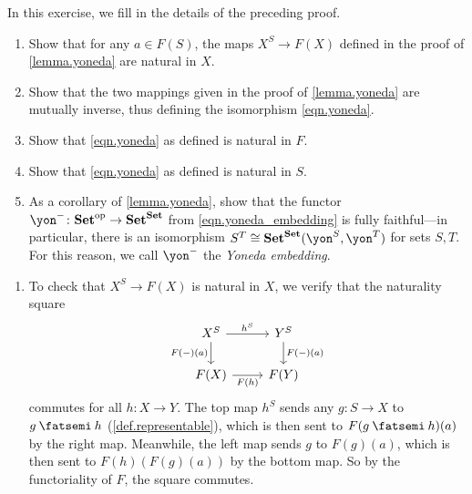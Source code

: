 \documentclass[Book-Poly]{subfiles}
\begin{document}
\begin{exercise}\label{exc.finish_proof_yoneda}
    In this exercise, we fill in the details of the preceding proof.
    \begin{enumerate}
        \item Show that for any $a\in F(S)$, the maps $X^S\to F(X)$ defined in the proof of \cref{lemma.yoneda} are natural in $X$.
        \item Show that the two mappings given in the proof of \cref{lemma.yoneda} are mutually inverse, thus defining the isomorphism \eqref{eqn.yoneda}.
        \item Show that \eqref{eqn.yoneda} as defined is natural in $F$.
        \item Show that \eqref{eqn.yoneda} as defined is natural in $S$.
        \item \label{exc.finish_proof_yoneda.embed} As a corollary of \cref{lemma.yoneda}, show that the functor $\yon^-\colon\smset\op\to\smset^\smset$ from \eqref{eqn.yoneda_embedding} is fully faithful---in particular, there is an isomorphism $S^T\iso \smset^\smset(\yon^S,\yon^T)$ for sets $S,T$.
        For this reason, we call $\yon^-$ the \emph{Yoneda embedding}.
        \qedhere
    \end{enumerate}

    \begin{solution}
        \begin{enumerate}
            \item To check that $X^S \to F(X)$ is natural in $X$, we verify that the naturality square
            \[
            \begin{tikzcd}[ampersand replacement=\&]
                X^S\ar[r, "h^S"]\ar[d, "F(-)(a)"']\&
                Y^S\ar[d, "F(-)(a)"]\\
                F(X)\ar[r, "F(h)"']\&
                F(Y)
            \end{tikzcd}
            \]
            commutes for all $h \colon X \to Y$.
            The top map $h^S$ sends any $g \colon S \to X$ to $g \then h$ (\cref{def.representable}), which is then sent to $F(g \then h)(a)$ by the right map.
            Meanwhile, the left map sends $g$ to $F(g)(a)$, which is then sent to $F(h)(F(g)(a))$ by the bottom map.
            So by the functoriality of $F$, the square commutes.


\end{enumerate}
\end{solution}
\end{exercise}
\end{document}
